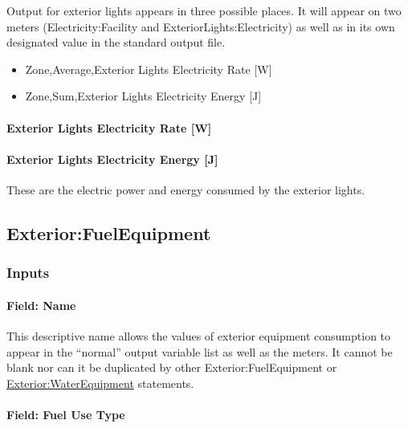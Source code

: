 Output for exterior lights appears in three possible places. It will appear on two meters (Electricity:Facility and ExteriorLights:Electricity) as well as in its own designated value in the standard output file.

\begin{itemize}
\item
  Zone,Average,Exterior Lights Electricity Rate {[}W{]}
\item
  Zone,Sum,Exterior Lights Electricity Energy {[}J{]}
\end{itemize}

\paragraph{Exterior Lights Electricity Rate {[}W{]}}\label{exterior-lights-electric-power-w}

\paragraph{Exterior Lights Electricity Energy {[}J{]}}\label{exterior-lights-electric-energy-j}

These are the electric power and energy consumed by the exterior lights.

\subsection{Exterior:FuelEquipment}\label{exteriorfuelequipment}

\subsubsection{Inputs}\label{inputs-1-015}

\paragraph{Field: Name}\label{field-name-1-014}

This descriptive name allows the values of exterior equipment consumption to appear in the ``normal'' output variable list as well as the meters. It cannot be blank nor can it be duplicated by other Exterior:FuelEquipment or \hyperref[exteriorwaterequipment]{Exterior:WaterEquipment} statements.

\paragraph{Field: Fuel Use Type}\label{exteriorfuelequipment-field-fuel-use-type}

